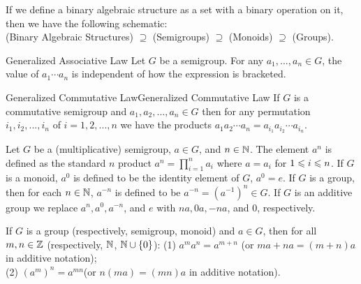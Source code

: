 \begin{remark}
    If we define a binary algebraic structure as a set with a binary operation on
    it, then we have the following schematic:\\

    \hspace{2cm}(Binary Algebraic Structures) $\supseteq$ (Semigroups) $\supseteq$ (Monoids) $\supseteq$ (Groups).
\end{remark}

\begin{proposition}{Generalized Associative Law}{}
    Let $G$ be a semigroup. For any $a_1,...,a_n\in G$, 
    the value of $a_1\cdots a_n$
    is independent of how the expression is bracketed.
\end{proposition}

\begin{proposition}{Generalized Commutative Law}{Generalized Commutative Law}
    If $G$ is a commutative semigroup and $a_1, a_2, . . . , a_n \in G$ 
    then for any permutation
    $i_1, i_2, . . . , i_n$ of $i = 1, 2, . . . , n$
     we have the products $a_1a_2 \cdots a_n = a_{i_1} a_{i_2}\cdots a_{i_n}$.
\end{proposition}

\begin{definition}{}{}
    Let $G$ be a (multiplicative) semigroup, $a \in G$, and $n \in \mathbb{N}$. 
    The element $a^n$ is defined as 
    the standard $n$ product $a^n =\prod_{i=1}^{n}a_i$
    where $a = a_i$ for $1 \leqslant i \leqslant n$. 
    If $G$ is a monoid, $a^0$ is defined to be the identity element of $G$, 
    $a^0=e$. If $G$ is a group, 
    then for each $n \in \mathbb{N}$, $a^{-n}$
    is defined to be $a^{-n} = (a^{-1})^n\in G$.
    If $G$ is an additive group we replace $a^n, a^0, a^{-n}$, and $e$ 
    with $na, 0a, -na$, and $0$, respectively.
\end{definition}

\begin{proposition}{}{}
    If $G$ is a group (respectively, semigroup, monoid) and $a \in G$,
    then for all $m, n \in \mathbb{Z}$ (respectively, $\mathbb{N}$, $\mathbb{N} \cup \{0\}$):
    (1) $a^ma^n=a^{m+n}$ (or $ma + na = (m + n)a$ in additive notation);
    \\
    (2) $(a^m)^n=a^{mn}$(or $n(ma) = (mn)a$ in additive notation).
\end{proposition}

